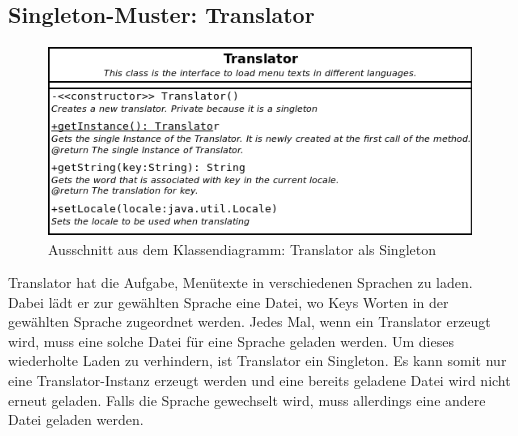 \documentclass[parskip=full]{scrartcl}
\begin{document}
\subsection{Singleton-Muster: Translator}
\begin{figure}[H]
  \centering
  \includegraphics[scale=0.4]{design/pattern-screenshots/singleton-Translator.png}
  \caption{Ausschnitt aus dem Klassendiagramm: Translator als Singleton}
\end{figure}
Translator hat die Aufgabe, Menütexte in verschiedenen Sprachen zu laden.
Dabei lädt er zur gewählten Sprache eine Datei, wo Keys Worten in der gewählten Sprache
zugeordnet werden. Jedes Mal, wenn ein Translator erzeugt wird, muss eine solche Datei
für eine Sprache geladen werden. Um dieses wiederholte Laden zu verhindern, ist Translator ein Singleton.
Es kann somit nur eine Translator-Instanz erzeugt werden und eine bereits geladene Datei
wird nicht erneut geladen. Falls die Sprache gewechselt wird, muss allerdings eine andere Datei geladen werden.

\pagebreak
\end{document}

